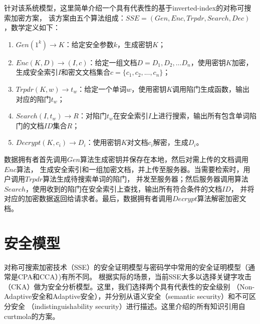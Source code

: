 针对该系统模型，这里简单介绍一个具有代表性的基于inverted-index的对称可搜索加密方案，
该方案由五个算法组成：$SSE = (Gen, Enc, Trpdr, Search, Dec)$，数学定义如下：
\begin{enumerate}
  \item
  $Gen(1^k ) \rightarrow K$：给定安全参数$k$，生成密钥$K$；

  \item
  $Enc(K,D) \rightarrow (I,c)$：给定一组文档$D={D_1,D_2  ,…D_n  }$，使用密钥$K$加密，
  生成安全索引$I$和密文文档集合$c =\{c_1, c_2, ..., c_n \}$；


  \item
  $Trpdr(K,w) \rightarrow t_w$：给定一个单词$w$，使用密钥$K$调用陷门生成函数，输出对应的陷门$t_w$；

  \item
  $Search(I,t_w) \rightarrow R$：对陷门$t_w$在安全索引$I$上进行搜索，输出所有包含单词陷门的文档$ID$集合$R$；

  \item
  $Decrypt(K, c_i) \rightarrow D_i$：使用密钥$K$对文档$c_i$解密，生成$D_i$。

\end{enumerate}
数据拥有者首先调用$Gen$算法生成密钥并保存在本地，然后对需上传的文档调用$Enc$算法，
生成安全索引和一组加密文档，并上传至服务器。当需要检索时，用户调用$Trpdr$算法生成待搜索单词的陷门，
并发至服务器；然后服务器调用算法$Search$，使用收到的陷门在安全索引上查找，输出所有符合条件的文档$ID$，
并将对应的加密数据返回给请求者。最后，数据拥有者调用$Decrypt$算法解密加密文档。



\section{安全模型}
\label{sec:search_symm_security_model}

对称可搜索加密技术（SSE）的安全证明模型与密码学中常用的安全证明模型（通常是CPA和CCA）)有所不同。
根据实际的场景，当前SSE大多以选择关键字攻击（CKA）做为安全分析模型。这里，我们选择两个具有代表性的安全级别
（Non-Adaptive安全和Adaptive安全），并分别从语义安全（semantic security）和不可区分安全
（indistinguishability security）进行描述。这里介绍的所有知识引用自curtmola的方案\cite{curtmola2006searchable}。


